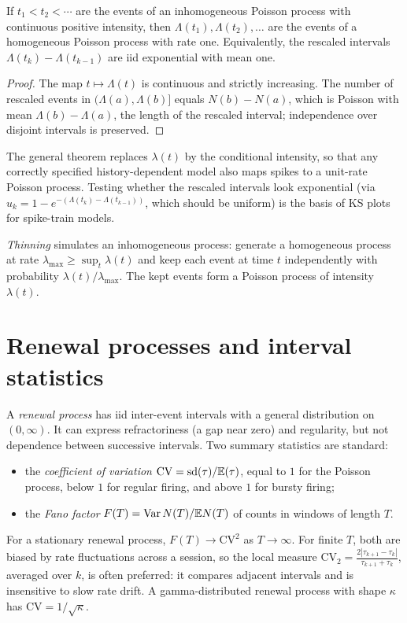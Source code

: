 \begin{theorem}
If $t_1<t_2<\cdots$ are the events of an inhomogeneous Poisson process with continuous positive intensity, then $\Lambda(t_1),\Lambda(t_2),\ldots$ are the events of a homogeneous Poisson process with rate one. Equivalently, the rescaled intervals $\Lambda(t_k)-\Lambda(t_{k-1})$ are iid exponential with mean one.
\end{theorem}
\begin{proof}
The map $t\mapsto\Lambda(t)$ is continuous and strictly increasing. The number of rescaled events in $(\Lambda(a),\Lambda(b)]$ equals $N(b)-N(a)$, which is Poisson with mean $\Lambda(b)-\Lambda(a)$, the length of the rescaled interval; independence over disjoint intervals is preserved.
\end{proof}
The general theorem replaces $\lambda(t)$ by the conditional intensity, so that any correctly specified history-dependent model also maps spikes to a unit-rate Poisson process. Testing whether the rescaled intervals look exponential (via $u_k=1-e^{-(\Lambda(t_k)-\Lambda(t_{k-1}))}$, which should be uniform) is the basis of KS plots for spike-train models.

\emph{Thinning} simulates an inhomogeneous process: generate a homogeneous process at rate $\lambda_{\max}\ge\sup_t\lambda(t)$ and keep each event at time $t$ independently with probability $\lambda(t)/\lambda_{\max}$. The kept events form a Poisson process of intensity $\lambda(t)$.

\section{Renewal processes and interval statistics}
A \emph{renewal process} has iid inter-event intervals with a general distribution on $(0,\infty)$. It can express refractoriness (a gap near zero) and regularity, but not dependence between successive intervals. Two summary statistics are standard:
\begin{itemize}[leftmargin=2em]
\item the \emph{coefficient of variation} $\mathrm{CV}=\mathrm{sd}(\tau)/\mathbb E(\tau)$, equal to $1$ for the Poisson process, below $1$ for regular firing, and above $1$ for bursty firing;
\item the \emph{Fano factor} $F(T)=\operatorname{Var} N(T)/\mathbb E N(T)$ of counts in windows of length $T$.
\end{itemize}
For a stationary renewal process, $F(T)\to\mathrm{CV}^2$ as $T\to\infty$. For finite $T$, both are biased by rate fluctuations across a session, so the local measure $\mathrm{CV}_2=\frac{2|\tau_{k+1}-\tau_k|}{\tau_{k+1}+\tau_k}$, averaged over $k$, is often preferred: it compares adjacent intervals and is insensitive to slow rate drift. A gamma-distributed renewal process with shape $\kappa$ has $\mathrm{CV}=1/\sqrt\kappa$.

